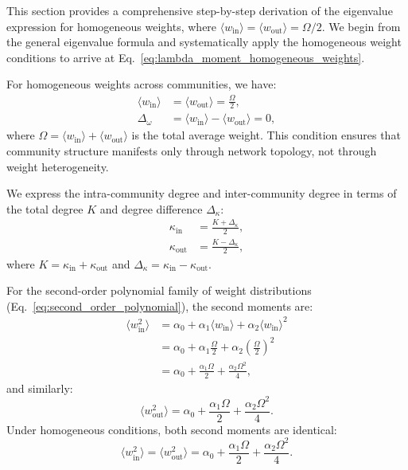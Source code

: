 \documentclass[a4paper,pre,superscriptaddress,floatfix,nofootinbib,twocolumn]{revtex4-1}
\begin{document}
This section provides a comprehensive step-by-step derivation of the eigenvalue expression for homogeneous weights, where $\langle w_\text{in} \rangle = \langle w_\text{out} \rangle = \Omega/2$. We begin from the general eigenvalue formula and systematically apply the homogeneous weight conditions to arrive at Eq.~\eqref{eq:lambda_moment_homogeneous_weights}.

For homogeneous weights across communities, we have:
\begin{align*}
\langle w_\text{in} \rangle &= \langle w_\text{out} \rangle = \frac{\Omega}{2},\\
\Delta_\omega &= \langle w_\text{in} \rangle - \langle w_\text{out} \rangle = 0,
\end{align*}
where $\Omega = \langle w_\text{in} \rangle + \langle w_\text{out} \rangle$ is the total average weight. This condition ensures that community structure manifests only through network topology, not through weight heterogeneity.

We express the intra-community degree and inter-community degree in terms of the total degree $K$ and degree difference $\Delta_\kappa$:
\begin{align*}
\kappa_\text{in} &= \frac{K + \Delta_\kappa}{2},\\
\kappa_\text{out} &= \frac{K - \Delta_\kappa}{2},
\end{align*}
where $K = \kappa_\text{in} + \kappa_\text{out}$ and $\Delta_\kappa = \kappa_\text{in} - \kappa_\text{out}$.

For the second-order polynomial family of weight distributions (Eq.~\eqref{eq:second_order_polynomial}), the second moments are:
\begin{align*}
\langle w^2_\text{in} \rangle &= \alpha_0 + \alpha_1 \langle w_\text{in} \rangle + \alpha_2 \langle w_\text{in} \rangle^2\\
&= \alpha_0 + \alpha_1 \frac{\Omega}{2} + \alpha_2 \left(\frac{\Omega}{2}\right)^2\\
&= \alpha_0 + \frac{\alpha_1 \Omega}{2} + \frac{\alpha_2 \Omega^2}{4},
\end{align*}
and similarly:
\begin{equation*}
\langle w^2_\text{out} \rangle = \alpha_0 + \frac{\alpha_1 \Omega}{2} + \frac{\alpha_2 \Omega^2}{4}.
\end{equation*}
Under homogeneous conditions, both second moments are identical:
\begin{equation*}
\langle w^2_\text{in} \rangle = \langle w^2_\text{out} \rangle = \alpha_0 + \frac{\alpha_1 \Omega}{2} + \frac{\alpha_2 \Omega^2}{4}.
\end{equation*}
\end{document}
